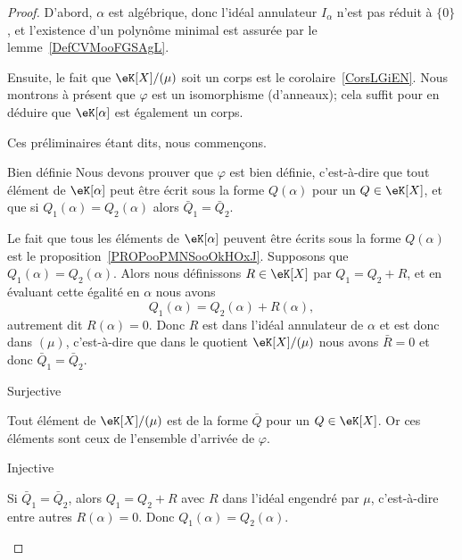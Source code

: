 \begin{proof}
    D'abord, \( \alpha\) est algébrique, donc l'idéal annulateur \( I_{\alpha}\) n'est pas réduit à \( \{ 0 \}\), et l'existence d'un polynôme minimal est assurée par le lemme~\ref{DefCVMooFGSAgL}.

    Ensuite, le fait que \( \eK[X]/(\mu)\) soit un corps est le corolaire~\ref{CorsLGiEN}. Nous montrons à présent que \( \varphi\) est un isomorphisme (d'anneaux); cela suffit pour en déduire que \( \eK[\alpha]\) est également un corps.

    Ces préliminaires étant dits, nous commençons.
    \begin{subproof}
        \item[Bien définie]
            Nous devons prouver que \( \varphi\) est bien définie, c'est-à-dire que tout élément de \( \eK[\alpha]\) peut être écrit sous la forme \( Q(\alpha)\) pour un \( Q\in \eK[X]\), et que si \( Q_1(\alpha)=Q_2(\alpha)\) alors \( \bar Q_1=\bar Q_2\).

            Le fait que tous les éléments de \( \eK[\alpha]\) peuvent être écrits sous la forme \( Q(\alpha)\) est le proposition~\ref{PROPooPMNSooOkHOxJ}. Supposons que \( Q_1(\alpha)=Q_2(\alpha)\). Alors nous définissons \( R\in \eK[X]\) par \( Q_1=Q_2+R\), et en évaluant cette égalité en \( \alpha\) nous avons
            \begin{equation}
                Q_1(\alpha)=Q_2(\alpha)+R(\alpha),
            \end{equation}
            autrement dit \( R(\alpha)=0\). Donc \( R\) est dans l'idéal annulateur de \( \alpha\) et est donc dans \( (\mu)\), c'est-à-dire que dans le quotient \( \eK[X]/(\mu)\) nous avons \( \bar R=0\) et donc \( \bar Q_1=\bar Q_2\).

        \item[Surjective]

            Tout élément de \( \eK[X]/(\mu)\) est de la forme \( \bar Q\) pour un \( Q\in \eK[X]\). Or ces éléments sont ceux de l'ensemble d'arrivée de \( \varphi\).

        \item[Injective]

            Si \( \bar Q_1=\bar Q_2\), alors \( Q_1=Q_2+R\) avec \( R\) dans l'idéal engendré par \( \mu\), c'est-à-dire entre autres \( R(\alpha)=0\). Donc \( Q_1(\alpha)=Q_2(\alpha)\).

    \end{subproof}


\end{proof}
